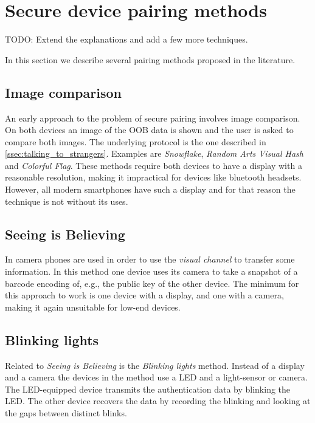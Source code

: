 \documentclass[conference, 12pt]{sty/IEEEtran}
\begin{document}
\section{Secure device pairing methods}
\label{sec:secure_device_pairing_methods}

TODO: Extend the explanations and add a few more techniques.

In this section we describe several pairing methods proposed in the literature.

\subsection{Image comparison}
An early approach to the problem of secure pairing involves image comparison.
On both devices an image of the OOB data is shown and the user is asked to compare both images.
The underlying protocol is the one described in \autoref{ssec:talking_to_strangers}.
Examples are \textit{Snowflake}\cite{goldberg1996visual}, \textit{Random Arts Visual Hash}\cite{perrig1999hash} and \textit{Colorful Flag}\cite{dohrmann2002public}.
These methods require both devices to have a display with a reasonable resolution, making it impractical for devices like bluetooth headsets.
However, all modern smartphones have such a display and for that reason the technique is not without its uses.

\subsection{Seeing is Believing}
In \cite{mccune2005seeing} camera phones are used in order to use the \textit{visual channel} to transfer some information.
In this method one device uses its camera to take a snapshot of a barcode encoding of, e.g., the public key of the other device.
The minimum for this approach to work is one device with a display, and one with a camera, making it again unsuitable for low-end devices.

\subsection{Blinking lights}
Related to \textit{Seeing is Believing} is the \textit{Blinking lights} method.
Instead of a display and a camera the devices in the method use a LED and a light-sensor or camera.
The LED-equipped device transmits the authentication data by blinking the LED.
The other device recovers the data by recording the blinking and looking at the gaps between distinct blinks.
\end{document}
